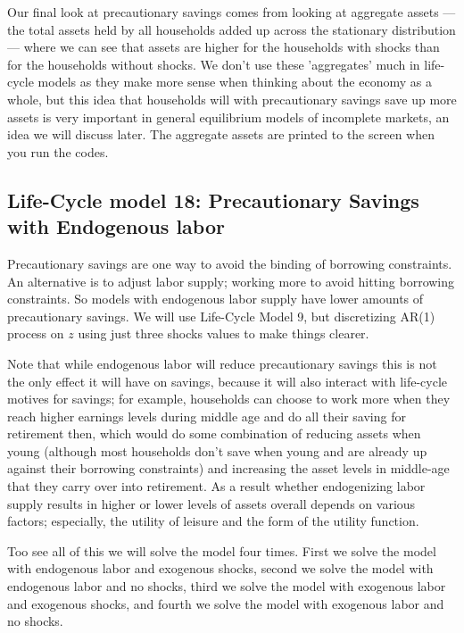 Our final look at precautionary savings comes from looking at aggregate assets ---the total assets held by all households added up across the stationary distribution--- where we can see that assets are higher for the households with shocks than for the households without shocks. We don't use these 'aggregates' much in life-cycle models as they make more sense when thinking about the economy as a whole, but this idea that households will with precautionary savings save up more assets is very important in general equilibrium models of incomplete markets, an idea we will discuss later. The aggregate assets are printed to the screen when you run the codes.

\subsection{Life-Cycle model 18: Precautionary Savings with Endogenous labor}
Precautionary savings are one way to avoid the binding of borrowing constraints. An alternative is to adjust labor supply; working more to avoid hitting borrowing constraints. So models with endogenous labor supply have lower amounts of precautionary savings. We will use Life-Cycle Model 9, but discretizing AR(1) process on $z$ using just three shocks values to make things clearer.

Note that while endogenous labor will reduce precautionary savings this is not the only effect it will have on savings, because it will also interact with life-cycle motives for savings; for example, households can choose to work more when they reach higher earnings levels during middle age and do all their saving for retirement then, which would do some combination of reducing assets when young (although most households don't save when young and are already up against their borrowing constraints) and increasing the asset levels in middle-age that they carry over into retirement. As a result whether endogenizing labor supply results in higher or lower levels of assets overall depends on various factors; especially, the utility of leisure and the form of the utility function.

Too see all of this we will solve the model four times. First we solve the model with endogenous labor and exogenous shocks, second we solve the model with endogenous labor and no shocks, third we solve the model with exogenous labor and exogenous shocks, and fourth we solve the model with exogenous labor and no shocks.

